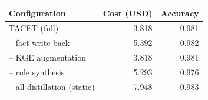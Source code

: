 \begin{tabular}{lrr}
\toprule
Configuration & Cost (USD) & Accuracy \\
\midrule
TACET (full) & 3.818 & 0.981 \\
-- fact write-back & 5.392 & 0.982 \\
-- KGE augmentation & 3.818 & 0.981 \\
-- rule synthesis & 5.293 & 0.976 \\
-- all distillation (static) & 7.948 & 0.983 \\
\bottomrule
\end{tabular}
